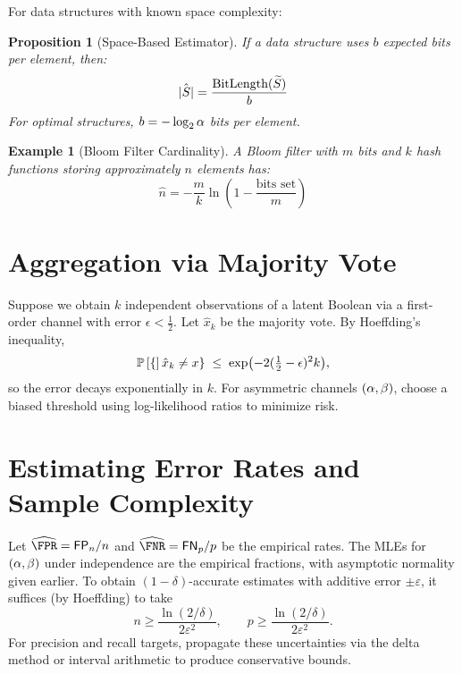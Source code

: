 \documentclass[11pt,final,hidelinks]{article}
\newtheorem{proposition}[theorem]{Proposition}
\newtheorem{example}[theorem]{Example}
\newcommand{\FP}{\mathsf{FP}}  %
\newcommand{\FN}{\mathsf{FN}}  %
\begin{document}
For data structures with known space complexity:

\begin{proposition}[Space-Based Estimator]
If a data structure uses $b$ expected bits per element, then:
\begin{equation}
\hat{|S|} = \frac{\text{BitLength}(\widetilde{S})}{b}
\end{equation}
For optimal structures, $b = -\log_2 \alpha$ bits per element.
\end{proposition}

\begin{example}[Bloom Filter Cardinality]
A Bloom filter with $m$ bits and $k$ hash functions storing approximately $n$ elements has:
\begin{equation}
\hat{n} = -\frac{m}{k} \ln\left(1 - \frac{\text{bits set}}{m}\right)
\end{equation}
\end{example}

\section{Aggregation via Majority Vote}

Suppose we obtain $k$ independent observations of a latent Boolean via a first-order channel with error $\epsilon<\tfrac12$. Let $\hat{x}_k$ be the majority vote. By Hoeffding's inequality,
\begin{equation}
\mathbb{P}\left[\{\right]\hat{x}_k \neq x\} \;\le\; \exp\bigl(-2(\tfrac12-\epsilon)^2 k\bigr),
\end{equation}
so the error decays exponentially in $k$. For asymmetric channels $(\alpha,\beta)$, choose a biased threshold using log-likelihood ratios to minimize risk.

\section{Estimating Error Rates and Sample Complexity}

Let $\widehat{\FPR}=\FP_n/n$ and $\widehat{\FNR}=\FN_p/p$ be the empirical rates. The MLEs for $(\alpha,\beta)$ under independence are the empirical fractions, with asymptotic normality given earlier. To obtain $(1-\delta)$-accurate estimates with additive error $\pm \varepsilon$, it suffices (by Hoeffding) to take
\begin{equation}
 n \ge \frac{\ln(2/\delta)}{2\varepsilon^2},\qquad p \ge \frac{\ln(2/\delta)}{2\varepsilon^2}.
\end{equation}
For precision and recall targets, propagate these uncertainties via the delta method or interval arithmetic to produce conservative bounds.
\end{document}
